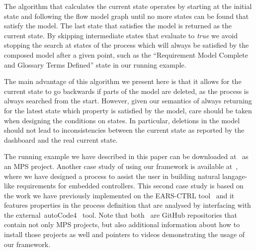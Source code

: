The algorithm that calculates the current state operates by starting at the
initial state and following the flow model graph until no more states can be
found that satisfy the model. The last state that satisfies the model is
returned as the current state. By skipping intermediate states that evaluate to
\emph{true} we avoid stopping the search at states of the process which will
always be satisfied by the composed model after a given point, such as the
``Requirement Model Complete and Glossary Terms Defined'' state in our running
example.

The main advantage of this algorithm we present here is that it allows for the
current state to go backwards if parts of the model are deleted, as the process
is always searched from the start. However, given our semantics of always
returning for the latest state which property is satisfied by the model, care
should be taken when designing the conditions on states. In particular,
deletions in the model should not lead to inconsistencies between the current
state as reported by the dashboard and the real current state.

The running example we have described in this paper can be downloaded
at~\cite{coolingControllerProcess} as an MPS project. Another case study of
using our framework is available at~\cite{earsctrlProcess}, where we have
designed a process to assist the user in building natural langage-like
requirements for embedded controllers. This second case study is based on the
work we have previously implemented on the EARS-CTRL tool~\cite{NFM17} and it
features properties in the process definition that are analysed by interfacing
with the  external~\textsf{autoCode4}~\cite{autoCode17} tool. Note that
both~\cite{coolingControllerProcess,earsctrlProcess} are GitHub repositories
that contain not only MPS projects, but also additional information about how to
install those projects as well and pointers to videos demonstrating the usage of
our framework.

